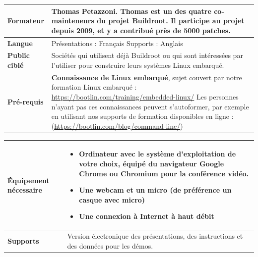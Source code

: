 \documentclass[a4paper,12pt,obeyspaces,spaces,hyphens]{article}
\begin{document}
{\begin{tabularx}{\textwidth}{|g|h|}
    {\bf Formateur} & {\bf Thomas Petazzoni}. Thomas est un des quatre
    co-mainteneurs du projet Buildroot. Il participe au projet depuis
    2009, et y a contribué près de 5000 patches.\\
    \hline

    {\bf Langue} & Présentations : Français
    \newline Supports : Anglais\\
    \hline

    {\bf Public ciblé} & Sociétés qui utilisent déjà Buildroot ou qui
    sont intéressées par l'utiliser pour construire leurs systèmes Linux
    embarqué.\\
    \hline

    {\bf Pré-requis} & {\bf Connaissance de Linux embarqué}, sujet couvert par
    notre formation Linux embarqué :
    \url{https://bootlin.com/training/embedded-linux/} \vspace{1em}
    \newline Les personnes n'ayant pas ces connaissances peuvent
    s'autoformer, par exemple en utilisant nos supports de formation
    disponibles en ligne :
    \newline (\url{https://bootlin.com/blog/command-line/}) \\
    \hline
  \end{tabularx}

  \begin{tabularx}{\textwidth}{|g|h|}
    {\bf Équipement nécessaire} &
    \begin{itemize}
    \item Ordinateur avec le système d'exploitation de votre choix, équipé du
          navigateur Google Chrome ou Chromium pour la conférence vidéo.
    \item Une webcam et un micro (de préférence un casque avec micro)
    \item Une connexion à Internet à haut débit
    \end{itemize}\\
    \hline

    {\bf Supports} & Version électronique des présentations, des instructions
   et des données pour les démos.\\
    \hline

\end{tabularx}}
\normalsize
\end{document}
